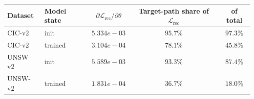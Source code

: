 \begin{tabular}{|l|l|c|c|c|}
\hline
Dataset & Model state & $\partial\mathcal{L}_{\mathrm{rec}}/\partial\theta$ & Target-path share of $\mathcal{L}_{\mathrm{rec}}$ & of total \\ \hline
CIC-v2 & init & $5.334e-03$ & $95.7\%$ & $97.3\%$ \\ \hline
CIC-v2 & trained & $3.104e-04$ & $78.1\%$ & $45.8\%$ \\ \hline
UNSW-v2 & init & $5.589e-03$ & $93.3\%$ & $87.4\%$ \\ \hline
UNSW-v2 & trained & $1.831e-04$ & $36.7\%$ & $18.0\%$ \\ \hline
\end{tabular}